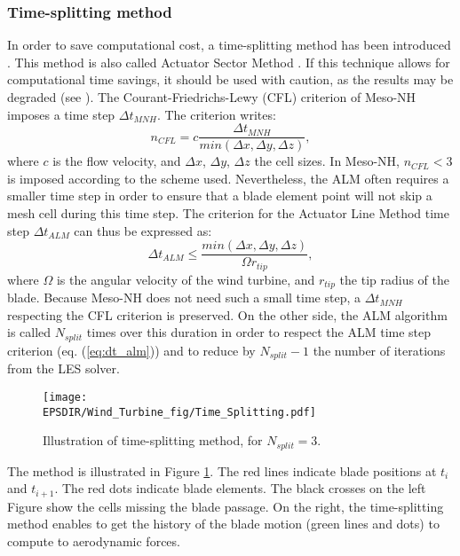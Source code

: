 \subsubsection*{Time-splitting method}
\label{sss:time_splitting}
In order to save computational cost, a time-splitting method has been introduced \citet{joulin2020theactuator}. This method is also called Actuator Sector Method \citet{Storey2015}. If this technique allows for computational time savings, it should be used with caution, as the results may be degraded (see \citet{joulin2019modelisation, jezequel2022simulations}).
The Courant-Friedrichs-Lewy (CFL) criterion of Meso-NH imposes a time step $\Delta t_{MNH}$. The criterion writes:
\begin{equation}	
n_{CFL} =  c \dfrac{\Delta t_{MNH}}{min(\Delta x,\Delta y,\Delta z)},
\label{eq:MNH_CLF}
\end{equation}  
where $c$ is the flow velocity, and  $\Delta x$, $\Delta y$, $\Delta z$ the cell sizes. In Meso-NH, $n_{CFL} < 3$ is imposed according to the scheme used.
\medbreak
Nevertheless, the ALM often requires a smaller time step in order to ensure that a blade element point will not skip a mesh cell during this time step. The criterion for the Actuator Line Method time step $ \Delta t_{ALM}$ can thus be expressed as:
\begin{equation}
\Delta t_{ALM} \leqslant \dfrac{min(\Delta x,\Delta y,\Delta z)}{\Omega r_{tip}},
\label{eq:dt_alm}
\end{equation}
where $\Omega$ is the angular velocity of the wind turbine, and $r_{tip}$ the tip radius of the blade.
\medbreak
Because Meso-NH does not need such a small time step, a $\Delta t_{MNH}$ respecting the CFL criterion is preserved. On the other side, the ALM algorithm is called $N_{split}$ times over this duration in order to respect the ALM time step criterion (eq. (\ref{eq:dt_alm})) and to reduce by $N_{split} - 1$ the number of iterations from the LES solver.
\medbreak
\begin{figure}[h]
\centering
\texttt{[image: \\EPSDIR/Wind\_Turbine\_fig/Time\_Splitting.pdf]}
\caption{Illustration of time-splitting method, for $N_{split} = 3$. \citet{joulin2019modelisation}}
\label{fig:timesplit}  
\end{figure}
The method is illustrated in Figure \ref{fig:timesplit}. The red lines indicate blade positions at $t_{i}$ and $t_{i+1}$. The red dots indicate blade elements. The black crosses on the left Figure show the cells missing the blade passage. On the right, the time-splitting method enables to get the history of the blade motion (green lines and dots) to compute to aerodynamic forces.

